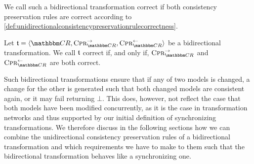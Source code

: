 We call such a bidirectional transformation correct if both consistency preservation rules are correct according to \autoref{def:unidirectionalconsistencypreservationrulecorrectness}.

\begin{definition}
    \label{def:bidirectionaltransformationcorrectness}
    Let $\transformation{t} = \tupled{\consistencyrelationset{CR}, \consistencypreservationrule{\consistencyrelationset{CR}}^{\rightarrow}, \consistencypreservationrule{\consistencyrelationset{CR}}^{\leftarrow}}$ be a bidirectional transformation.
    We call $\transformation{t}$ correct if, and only if, $\consistencypreservationrule{\consistencyrelationset{CR}}^{\rightarrow}$ and $\consistencypreservationrule{\consistencyrelationset{CR}}^{\leftarrow}$ are both correct.
\end{definition}

Such bidirectional transformations ensure that if any of two models is changed, a change for the other is generated such that both changed models are consistent again, or it may fail returning $\bot$.
This does, however, not reflect the case that both models have been modified concurrently, as it is the case in transformation networks and thus supported by our initial definition of synchronizing transformations.
We therefore discuss in the following sections how we can combine the unidirectional consistency preservation rules of a bidirectional transformation and which requirements we have to make to them such that the bidirectional transformation behaves like a synchronizing one.
